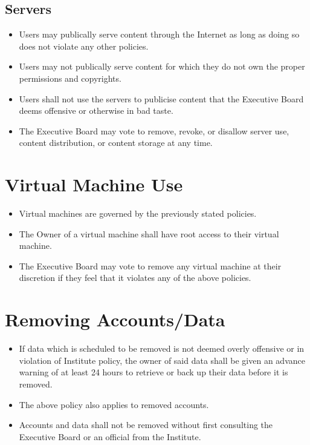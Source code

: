 \subsection{Servers}
\begin{itemize}
\item Users may publically serve content through the Internet as long as doing so does not violate any other policies.
\item Users may not publically serve content for which they do not own the proper permissions and copyrights.
\item Users shall not use the servers to publicise content that the Executive Board deems offensive or otherwise in bad taste.
\item The Executive Board may vote to remove, revoke, or disallow server use, content distribution, or content storage at any time.
\end{itemize}

\section{Virtual Machine Use}
\begin{itemize}
\item Virtual machines are governed by the previously stated policies.
\item The Owner of a virtual machine shall have root access to their virtual machine.
\item The Executive Board may vote to remove any virtual machine at their discretion if they feel that it violates any of the above policies.
\end{itemize}

\section{Removing Accounts/Data}
\begin{itemize}
\item If data which is scheduled to be removed is not deemed overly offensive or in violation of Institute policy, the owner of said data shall be given an advance warning of at least 24 hours to retrieve or back up their data before it is removed.
\item The above policy also applies to removed accounts.
\item Accounts and data shall not be removed without first consulting the Executive Board or an official from the Institute.
\end{itemize}


